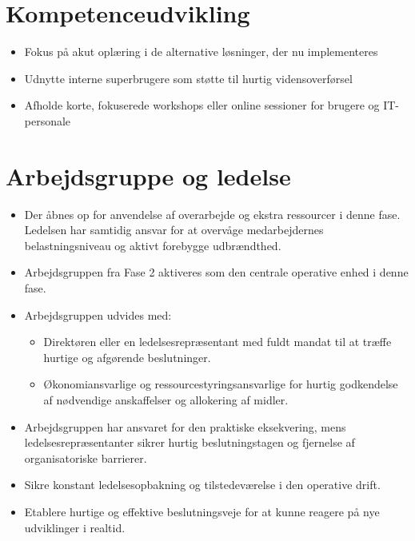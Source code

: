 \documentclass[a4paper,11pt]{book}
\begin{document}
\section{Kompetenceudvikling}\label{kompetenceudvikling}

\begin{itemize}
\tightlist
\item
  Fokus på akut oplæring i de alternative løsninger, der nu
  implementeres
\item
  Udnytte interne superbrugere som støtte til hurtig vidensoverførsel
\item
  Afholde korte, fokuserede workshops eller online sessioner for brugere
  og IT-personale
\end{itemize}

\section{Arbejdsgruppe og ledelse}\label{arbejdsgruppe-og-ledelse}

\begin{itemize}
\item
  Der åbnes op for anvendelse af overarbejde og ekstra ressourcer i
  denne fase. Ledelsen har samtidig ansvar for at overvåge
  medarbejdernes belastningsniveau og aktivt forebygge udbrændthed.
\item
  Arbejdsgruppen fra Fase 2 aktiveres som den centrale operative enhed i
  denne fase.
\item
  Arbejdsgruppen udvides med:

  \begin{itemize}
  \tightlist
  \item
    Direktøren eller en ledelsesrepræsentant med fuldt mandat til at
    træffe hurtige og afgørende beslutninger.
  \item
    Økonomiansvarlige og ressourcestyringsansvarlige for hurtig
    godkendelse af nødvendige anskaffelser og allokering af midler.
  \end{itemize}
\item
  Arbejdsgruppen har ansvaret for den praktiske eksekvering, mens
  ledelsesrepræsentanter sikrer hurtig beslutningstagen og fjernelse af
  organisatoriske barrierer.
\item
  Sikre konstant ledelsesopbakning og tilstedeværelse i den operative
  drift.
\item
  Etablere hurtige og effektive beslutningsveje for at kunne reagere på
  nye udviklinger i realtid.
\end{itemize}
\end{document}

